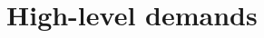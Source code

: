 \documentclass[Main]{subfiles}
\begin{document}
\chapter{High-level demands}


%
%
%
%
\end{document}
